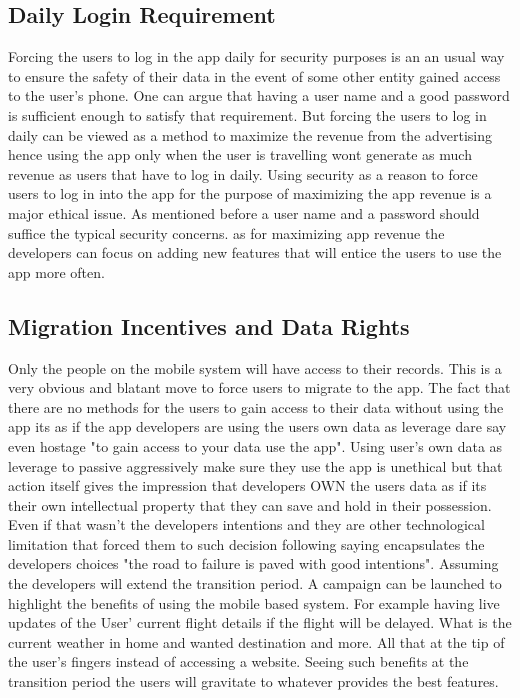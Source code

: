 \documentclass{article}
\begin{document}
\subsection{Daily Login Requirement}
Forcing the users to log in the app daily for security purposes is an an usual way to ensure the safety of their data in the event of some other entity gained access to the user's phone. One can argue that having a user name and a good password is sufficient enough to satisfy that requirement. But forcing the users to log in daily can be viewed as a method to maximize the revenue from the advertising hence using the app only when the user is travelling wont generate as much revenue as users that have to log in daily. Using security as a reason to force users to log in into the app for the purpose of maximizing the app revenue is a major ethical issue. As mentioned before a user name and a password should suffice the typical security concerns. as for maximizing app revenue the developers can focus on adding new features that will entice the users to use the app more often. 




\subsection{Migration Incentives and Data Rights}
Only the people on the mobile system will have access to their records. This is a very obvious and blatant move to force users to migrate to the app. The fact that there are no methods for the users to gain access to their data without using the app its as if the app developers are using the users own data as leverage dare say even hostage "to gain access to your data use the app". Using user's own data as leverage to passive aggressively make sure they use the app is unethical but that action itself gives the impression that developers OWN the users data as if its their own intellectual property that they can save and hold in their possession. Even if that wasn't the developers intentions and they are other technological limitation that forced them to such decision following saying encapsulates the developers choices "the road to failure is paved with good intentions". Assuming the developers will extend the transition period. A campaign can be launched to highlight the benefits of using the mobile based system. For example having live updates of the User' current flight details if the flight will be delayed. What is the current weather in home and wanted destination and more. All that at the tip of the user's fingers instead of accessing a website. Seeing such benefits at the transition period the users will gravitate to whatever provides the best features. 
\end{document}
